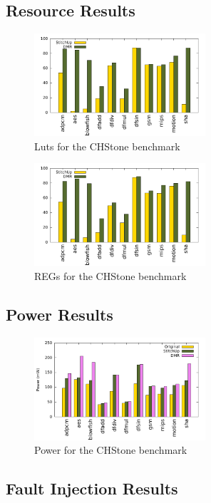 \subsection{Resource Results}

\begin{figure}[!t]
\centering
\includegraphics[width=2.5in]{./graphs/chstone_luts_24_09_2015.pdf}
\caption{Luts for the CHStone benchmark}
\label{fig:luts_result}
\end{figure}

\begin{figure}[!t]
\centering
\includegraphics[width=2.5in]{./graphs/chstone_reg_24_09_2015.pdf}
\caption{REGs for the CHStone benchmark}
\label{fig:regs_result}
\end{figure}

\subsection{Power Results}

\begin{figure}[!t]
\centering
\includegraphics[width=2.5in]{./graphs/chstone_absolute_power_24_09_2015.pdf}
\caption{Power for the CHStone benchmark}
\label{fig:power_result}
\end{figure}

\subsection{Fault Injection Results}
